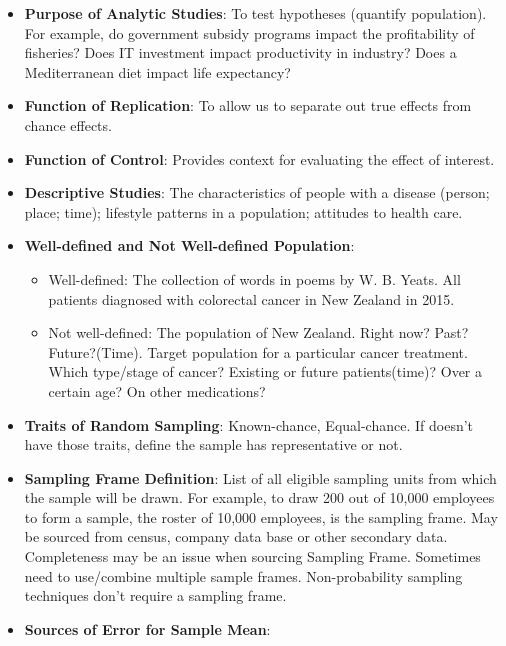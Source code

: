 \documentclass[12pt]{book}
\begin{document}
\newpage

\pagestyle{fancy}

\begin{itemize}
\item \textbf{Purpose of Analytic Studies}: To test hypotheses (quantify population). For example, do government subsidy programs impact the profitability of fisheries? Does IT investment impact productivity in industry? Does a Mediterranean diet impact life expectancy?
\item \textbf{Function of Replication}: To allow us to separate out true effects from chance effects.
\item \textbf{Function of Control}: Provides context for evaluating the effect of interest.
\item \textbf{Descriptive Studies}: The characteristics of people with a disease (person; place; time); lifestyle patterns in a population; attitudes to health care.
\item \textbf{Well-defined and Not Well-defined Population}:
    \begin{itemize}
    \item Well-defined: The collection of words in poems by W. B. Yeats. All patients diagnosed with colorectal cancer in New Zealand in 2015.
    \item Not well-defined: The population of New Zealand. Right now? Past? Future?(Time). Target population for a particular cancer treatment. Which type/stage of cancer? Existing or future patients(time)? Over a certain age? On other medications?
    \end{itemize}
\item \textbf{Traits of Random Sampling}: Known-chance, Equal-chance. If doesn't have those traits, define the sample has representative or not.
\item \textbf{Sampling Frame Definition}: List of all eligible sampling units from which the sample will be drawn. For example, to draw 200 out of 10,000 employees to form a sample, the roster of 10,000 employees, is the sampling frame. May be sourced from census, company data base or other secondary data. Completeness may be an issue when sourcing Sampling Frame. Sometimes need to use/combine multiple sample frames. Non-probability sampling techniques don't require a sampling frame.
\item \textbf{Sources of Error for Sample Mean}:


\end{itemize}
\end{document}
